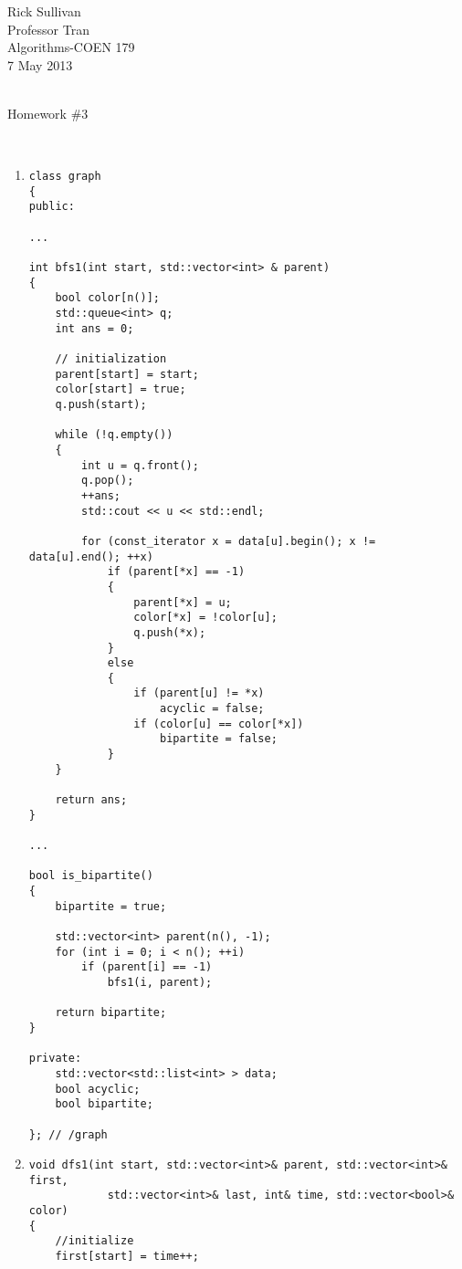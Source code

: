 \documentclass{article}
\begin{document}
\noindent   Rick Sullivan   \\
            Professor Tran  \\
            Algorithms-COEN 179 \\
            7 May 2013      \\
                            \\
\centerline{Homework \#3}   \\

\begin{enumerate}
    \item
        \begin{lstlisting}
class graph
{
public:

...

int bfs1(int start, std::vector<int> & parent) 
{
    bool color[n()];
    std::queue<int> q;
    int ans = 0;
    
    // initialization
    parent[start] = start;
    color[start] = true;
    q.push(start);

    while (!q.empty())
    {
        int u = q.front();	
        q.pop();
        ++ans;
        std::cout << u << std::endl;

        for (const_iterator x = data[u].begin(); x != data[u].end(); ++x)
            if (parent[*x] == -1)
            {
                parent[*x] = u;
                color[*x] = !color[u];
                q.push(*x);
            }
            else
            {
                if (parent[u] != *x)
                    acyclic = false;
                if (color[u] == color[*x])
                    bipartite = false;
            }
    }

    return ans;
}

...

bool is_bipartite()
{
    bipartite = true;

    std::vector<int> parent(n(), -1);
    for (int i = 0; i < n(); ++i)
        if (parent[i] == -1)
            bfs1(i, parent);

    return bipartite;
}

private:
    std::vector<std::list<int> > data;
    bool acyclic;
    bool bipartite;

}; // /graph
        \end{lstlisting}

    \item
        \begin{lstlisting}
void dfs1(int start, std::vector<int>& parent, std::vector<int>& first,
            std::vector<int>& last, int& time, std::vector<bool>& color)
{
    //initialize
    first[start] = time++;


\end{lstlisting}
\end{enumerate}
\end{document}
